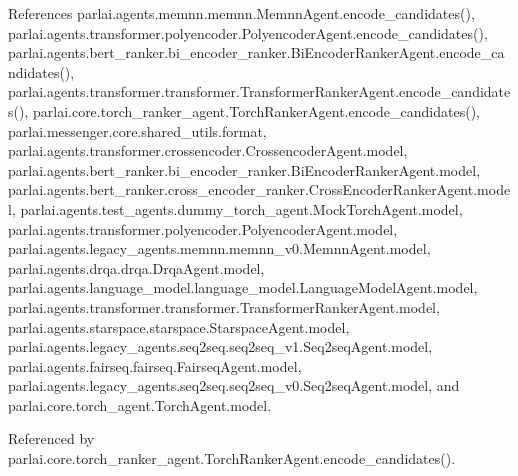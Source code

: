References parlai.\+agents.\+memnn.\+memnn.\+Memnn\+Agent.\+encode\+\_\+candidates(), parlai.\+agents.\+transformer.\+polyencoder.\+Polyencoder\+Agent.\+encode\+\_\+candidates(), parlai.\+agents.\+bert\+\_\+ranker.\+bi\+\_\+encoder\+\_\+ranker.\+Bi\+Encoder\+Ranker\+Agent.\+encode\+\_\+candidates(), parlai.\+agents.\+transformer.\+transformer.\+Transformer\+Ranker\+Agent.\+encode\+\_\+candidates(), parlai.\+core.\+torch\+\_\+ranker\+\_\+agent.\+Torch\+Ranker\+Agent.\+encode\+\_\+candidates(), parlai.\+messenger.\+core.\+shared\+\_\+utils.\+format, parlai.\+agents.\+transformer.\+crossencoder.\+Crossencoder\+Agent.\+model, parlai.\+agents.\+bert\+\_\+ranker.\+bi\+\_\+encoder\+\_\+ranker.\+Bi\+Encoder\+Ranker\+Agent.\+model, parlai.\+agents.\+bert\+\_\+ranker.\+cross\+\_\+encoder\+\_\+ranker.\+Cross\+Encoder\+Ranker\+Agent.\+model, parlai.\+agents.\+test\+\_\+agents.\+dummy\+\_\+torch\+\_\+agent.\+Mock\+Torch\+Agent.\+model, parlai.\+agents.\+transformer.\+polyencoder.\+Polyencoder\+Agent.\+model, parlai.\+agents.\+legacy\+\_\+agents.\+memnn.\+memnn\+\_\+v0.\+Memnn\+Agent.\+model, parlai.\+agents.\+drqa.\+drqa.\+Drqa\+Agent.\+model, parlai.\+agents.\+language\+\_\+model.\+language\+\_\+model.\+Language\+Model\+Agent.\+model, parlai.\+agents.\+transformer.\+transformer.\+Transformer\+Ranker\+Agent.\+model, parlai.\+agents.\+starspace.\+starspace.\+Starspace\+Agent.\+model, parlai.\+agents.\+legacy\+\_\+agents.\+seq2seq.\+seq2seq\+\_\+v1.\+Seq2seq\+Agent.\+model, parlai.\+agents.\+fairseq.\+fairseq.\+Fairseq\+Agent.\+model, parlai.\+agents.\+legacy\+\_\+agents.\+seq2seq.\+seq2seq\+\_\+v0.\+Seq2seq\+Agent.\+model, and parlai.\+core.\+torch\+\_\+agent.\+Torch\+Agent.\+model.



Referenced by parlai.\+core.\+torch\+\_\+ranker\+\_\+agent.\+Torch\+Ranker\+Agent.\+encode\+\_\+candidates().

